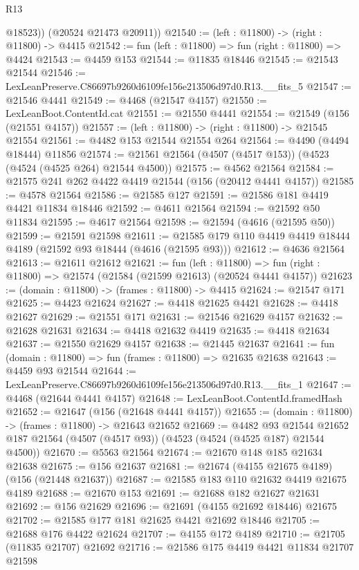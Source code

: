 \begin{lexlean}{R13}
\begin{coremodule}
          @18523))
      (@20524 @21473 @20911))
@21540 := (left : @11800) -> (right : @11800) -> @4415
@21542 := fun (left : @11800) => fun (right : @11800) => @4424
@21543 := @4459 @153
@21544 := @11835 @18446
@21545 := @21543 @21544
@21546 := LexLeanPreserve.C86697b9260d6109fe156e213506d97d0.R13.__fits_5
@21547 := @21546 @4441
@21549 := @4468 (@21547 @4157)
@21550 := LexLeanBoot.ContentId.cat
@21551 := @21550 @4441
@21554 := @21549 (@156 (@21551 @4157))
@21557 := (left : @11800) -> (right : @11800) -> @21545 @21554
@21561 := @4482 @153 @21544 @21554 @264
@21564 := @4490 (@4494 @18444) @11856
@21574 := @21561 @21564 (@4507 (@4517 @153)) (@4523 (@4524 (@4525 @264) @21544 @4500))
@21575 := @4562 @21564
@21584 := @21575 @241 @262 @4422 @4419 @21544 (@156 (@20412 @4441 @4157))
@21585 := @4578 @21564
@21586 := @21585 @127
@21591 := @21586 @181 @4419 @4421 @11834 @18446
@21592 := @4611 @21564
@21594 := @21592 @50 @11834
@21595 := @4617 @21564
@21598 := @21594 (@4616 (@21595 @50))
@21599 := @21591 @21598
@21611 := @21585 @179 @110 @4419 @4419 @18444 @4189 (@21592 @93 @18444 (@4616 (@21595 @93)))
@21612 := @4636 @21564
@21613 := @21611 @21612
@21621 := fun (left : @11800) =>
  fun (right : @11800) => @21574 (@21584 (@21599 @21613) (@20524 @4441 @4157))
@21623 := (domain : @11800) -> (frames : @11800) -> @4415
@21624 := @21547 @171
@21625 := @4423 @21624
@21627 := @4418 @21625 @4421
@21628 := @4418 @21627
@21629 := @21551 @171
@21631 := @21546 @21629 @4157
@21632 := @21628 @21631
@21634 := @4418 @21632 @4419
@21635 := @4418 @21634
@21637 := @21550 @21629 @4157
@21638 := @21445 @21637
@21641 := fun (domain : @11800) => fun (frames : @11800) => @21635 @21638
@21643 := @4459 @93 @21544
@21644 := LexLeanPreserve.C86697b9260d6109fe156e213506d97d0.R13.__fits_1
@21647 := @4468 (@21644 @4441 @4157)
@21648 := LexLeanBoot.ContentId.framedHash
@21652 := @21647 (@156 (@21648 @4441 @4157))
@21655 := (domain : @11800) -> (frames : @11800) -> @21643 @21652
@21669 := @4482
    @93
    @21544
    @21652
    @187
    @21564
    (@4507 (@4517 @93))
    (@4523 (@4524 (@4525 @187) @21544 @4500))
@21670 := @5563 @21564
@21674 := @21670 @148 @185 @21634 @21638
@21675 := @156 @21637
@21681 := @21674 (@4155 @21675 @4189) (@156 (@21448 @21637))
@21687 := @21585 @183 @110 @21632 @4419 @21675 @4189
@21688 := @21670 @153
@21691 := @21688 @182 @21627 @21631
@21692 := @156 @21629
@21696 := @21691 (@4155 @21692 @18446) @21675
@21702 := @21585 @177 @181 @21625 @4421 @21692 @18446
@21705 := @21688 @176 @4422 @21624
@21707 := @4155 @172 @4189
@21710 := @21705 (@11835 @21707) @21692
@21716 := @21586 @175 @4419 @4421 @11834 @21707 @21598

\end{coremodule}
\end{lexlean}
